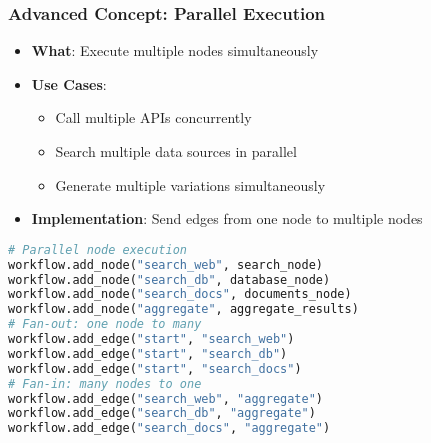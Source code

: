 \begin{frame}[fragile]\frametitle{Advanced Concept: Parallel Execution}
      \begin{itemize}
        \item \textbf{What}: Execute multiple nodes simultaneously
        \item \textbf{Use Cases}:
        \begin{itemize}
            \item Call multiple APIs concurrently
            \item Search multiple data sources in parallel
            \item Generate multiple variations simultaneously
        \end{itemize}
        \item \textbf{Implementation}: Send edges from one node to multiple nodes
      \end{itemize}
      
      \begin{lstlisting}[language=Python, basicstyle=\small]
# Parallel node execution
workflow.add_node("search_web", search_node)
workflow.add_node("search_db", database_node)
workflow.add_node("search_docs", documents_node)
workflow.add_node("aggregate", aggregate_results)
# Fan-out: one node to many
workflow.add_edge("start", "search_web")
workflow.add_edge("start", "search_db")
workflow.add_edge("start", "search_docs")
# Fan-in: many nodes to one
workflow.add_edge("search_web", "aggregate")
workflow.add_edge("search_db", "aggregate")
workflow.add_edge("search_docs", "aggregate")
      \end{lstlisting}
\end{frame}

